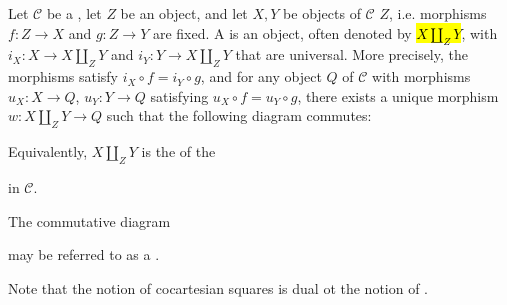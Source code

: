 \begin{definition} \label{definition:pushout_of_objects_under_an_object_in_a_category}
    Let $\mathcal{C}$ be a , let $Z$ be an object, and let $X, Y$ be objects of $\mathcal{C}$   $Z$, i.e. morphisms $f : Z \to X$ and $g : Z \to Y$ are fixed. A  is an object, often denoted by \hl{$X \amalg_Z Y$}, with  $i_X : X \to X \amalg_Z Y$ and $i_Y : Y \to X \amalg_Z Y$ that are universal. 
    More precisely, the morphisms satisfy $i_X \circ f = i_Y \circ g$, and for any object $Q$ of $\mathcal{C}$ with morphisms $u_X : X \to Q$, $u_Y : Y \to Q$ satisfying $u_X \circ f = u_Y \circ g$, there exists a unique morphism $w : X \amalg_Z Y \to Q$ such that the following diagram commutes:
        \begin{center}
        \end{center}
        
    Equivalently, $X \amalg_Z Y$ is the  of the 
        \begin{center}
        \end{center}
    in $\mathcal{C}$. 

    The commutative diagram 
    \begin{center}
    \end{center}
    may be referred to as a .

    Note that the notion of cocartesian squares is dual ot the notion of .
\end{definition}